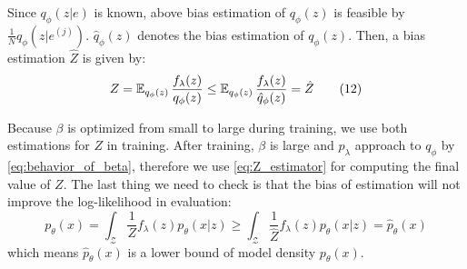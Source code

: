 Since $q_\phi(z|e)$ is known, above bias estimation of $q_\phi(z)$ is feasible by $\frac{1}{N} q_\phi(z|e^{(j)})$. $\hat{q}_\phi(z)$ denotes the bias estimation of $q_\phi(z)$. Then, a bias estimation $\hat{Z}$ is given by:
\begin{align*}\label{eq:Z_estimator}
	Z = \operatorname{\mathbb{E}}_{q_\phi(z)}\frac{f_\lambda(z)}{q_\phi(z)} \leq \operatorname{\mathbb{E}}_{q_\phi(z)} \frac{f_\lambda(z)}{\hat{q}_\phi(z)} = \hat{Z} \tag{12}
\end{align*}

Because $\beta$ is optimized from small to large during training, we use both estimations for $Z$ in training. After training, $\beta$ is large and $p_\lambda$ approach to $q_\phi$ by \cref{eq:behavior_of_beta}, therefore we use \cref{eq:Z_estimator} for computing the final value of $Z$. The last thing we need to check is that the bias of estimation will not improve the log-likelihood in evaluation:
\begin{equation*}
	p_\theta(x) = \int_{\mathcal{Z}} \frac{1}{Z} f_\lambda(z) p_\theta(x|z) \geq \int_{\mathcal{Z}} \frac{1}{\hat{Z}} f_\lambda(z) p_\theta(x|z) = \hat{p}_\theta(x)
\end{equation*}
which means $\hat{p}_\theta(x)$ is a lower bound of model density $p_\theta(x)$. 